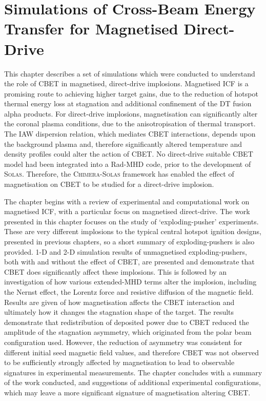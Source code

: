 \chapter{Simulations of Cross-Beam Energy Transfer for Magnetised Direct-Drive}%
\label{chap:Mag}
\acresetall

This chapter describes a set of simulations which were conducted to understand the role of \ac{CBET} in magnetised, direct-drive implosions.
Magnetised \ac{ICF} is a promising route to achieving higher target gains, due to the reduction of hotspot thermal energy loss at stagnation and additional confinement of the DT fusion alpha products.
For direct-drive implosions, magnetisation can significantly alter the coronal plasma conditions, due to the anisotropisation of thermal transport.
The \ac{IAW} dispersion relation, which mediates \ac{CBET} interactions, depends upon the background plasma and, therefore significantly altered temperature and density profiles could alter the action of \ac{CBET}.
No direct-drive suitable \ac{CBET} model had been integrated into a \ac{Rad-MHD} code, prior to the development of \textsc{Solas}.
Therefore, the \textsc{Chimera}-\textsc{Solas} framework has enabled the effect of magnetisation on \ac{CBET} to be studied for a direct-drive implosion.

The chapter begins with a review of experimental and computational work on magnetised \ac{ICF}, with a particular focus on magnetised direct-drive.
The work presented in this chapter focuses on the study of `exploding-pusher' experiments.
These are very different implosions to the typical central hotspot ignition designs, presented in previous chapters, so a short summary of exploding-pushers is also provided.
1-D and 2-D simulation results of unmagnetised exploding-pushers, both with and without the effect of \ac{CBET}, are presented and demonstrate that \ac{CBET} does significantly affect these implosions.
This is followed by an investigation of how various extended-\ac{MHD} terms alter the implosion, including the Nernst effect, the Lorentz force and resistive diffusion of the magnetic field.
Results are given of how magnetisation affects the \ac{CBET} interaction and ultimately how it changes the stagnation shape of the target.
The results demonstrate that redistribution of deposited power due to \ac{CBET} reduced the amplitude of the stagnation asymmetry, which originated from the polar beam configuration used.
However, the reduction of asymmetry was consistent for different initial seed magnetic field values, and therefore \ac{CBET} was not observed to be sufficiently strongly affected by magnetisation to lead to observable signatures in experimental measurements.
The chapter concludes with a summary of the work conducted, and suggestions of additional experimental configurations, which may leave a more significant signature of magnetisation altering \ac{CBET}.

